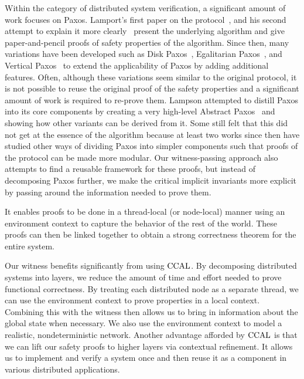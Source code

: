 Within the category of distributed system verification,
a significant amount of work focuses on Paxos.
Lamport's first paper on the protocol~\cite{paxos}, and his second attempt to explain it more clearly~\cite{paxosmadesimple}
present the underlying algorithm and give paper-and-pencil proofs of safety properties of the algorithm.
Since then, many variations have been developed such as Disk Paxos~\cite{diskpaxos}, Egalitarian Paxos~\cite{epaxos},
and Vertical Paxos~\cite{vertpaxos} to extend the applicability of Paxos by adding additional features. 
Often, although these variations seem similar to the original protocol, 
it is not possible to reuse the original
proof of the safety properties and a significant amount of work is required to re-prove them.
Lampson attempted to distill Paxos into its core components by creating a very high-level Abstract Paxos~\cite{Lampson2001}
and showing how other variants can be derived from it.
Some still felt that this did not get at the essence of the algorithm because at least two works since then \cite{dpaxos, sdpaxos}
have studied other ways of dividing Paxos into simpler components such that  proofs of the protocol can be made more modular.
Our witness-passing approach also attempts to find a reusable framework for these proofs,
but instead of decomposing Paxos further, we make the critical implicit invariants more explicit by passing around
the information needed to prove them.

It enables proofs to be done in a thread-local (or node-local) manner using an environment context to
capture the behavior of the rest of the world.
These proofs can then be linked together to obtain a strong correctness theorem for the entire system.

Our witness benefits significantly from using $\mathrm{CCAL}$.
By decomposing distributed systems into layers, we reduce the amount of time and effort needed to
prove functional correctness.
By treating each distributed node as a separate thread, we can use the environment context to
prove properties in a local context.
Combining this with the witness then allows us to bring in information about the global state when necessary.
We also use the environment context to model a realistic, nondeterministic network.
Another advantage afforded by $\mathrm{CCAL}$ is that we can lift our safety proofs to higher layers via contextual refinement.
It allows us to implement and verify a system once and then reuse it as a component in various distributed applications.



